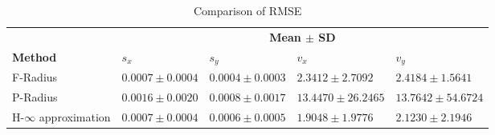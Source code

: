 \begin{table}[!h]
\caption{Comparison of RMSE}
	\centering
	\renewcommand{\arraystretch}{1.1}
	\small	
	\begin{tabular}{l l l l l}
		\toprule 
		& \multicolumn{4}{c}{\textbf{Mean $\pm$ SD}} \\ \cmidrule{2-5}
		\textbf{Method} & \textbf{$s_x$} & \textbf{$s_y$} & \textbf{$v_x$} & \textbf{$v_y$}\\ \midrule
		F-Radius & $0.0007\pm 0.0004$ &  $0.0004  \pm 0.0003$ &  $2.3412 \pm 2.7092$ &   $2.4184 \pm 1.5641$ \\
		P-Radius & $0.0016 \pm 0.0020$ &   $0.0008 \pm 0.0017$  & $13.4470 \pm 26.2465$ &  $13.7642 \pm 54.6724$\\
		H-$\infty$ approximation & $0.0007 \pm 0.0004$ &  $0.0006 \pm 0.0005$   & $1.9048 \pm  1.9776$  &  $ 2.1230 \pm  2.1946$\\
		\bottomrule
	\end{tabular}
	\label{tab:errormean}
\end{table}

%
%



